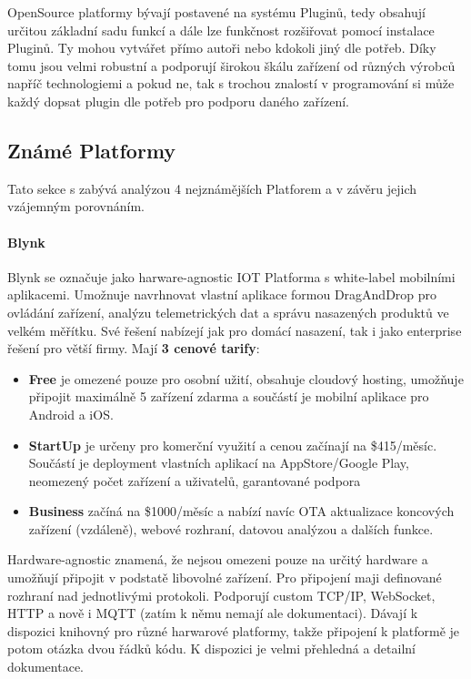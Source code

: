 \documentclass[thesis=B,czech]{FITthesis}[2019/12/23]
\begin{document}
OpenSource platformy bývají postavené na systému Pluginů, tedy obsahují určitou základní sadu funkcí a dále lze funkčnost rozšiřovat pomocí instalace Pluginů. Ty mohou vytvářet přímo autoři nebo kdokoli jiný dle potřeb. Díky tomu jsou velmi robustní a podporují širokou škálu zařízení od různých výrobců napříč technologiemi a pokud ne, tak s trochou znalostí v programování si může každý dopsat plugin dle potřeb pro podporu daného zařízení.


\subsection{Známé Platformy}  %
Tato sekce s zabývá analýzou 4 nejznámějších Platforem a v závěru jejich vzájemným porovnáním.

\paragraph{Blynk}
Blynk se označuje jako harware-agnostic IOT Platforma s white-label mobilními aplikacemi. Umožnuje navrhnovat vlastní aplikace formou DragAndDrop pro ovládání zařízení, analýzu telemetrických dat a správu nasazených produktů ve velkém měřítku. Své řešení nabízejí jak pro domácí nasazení, tak i jako enterprise řešení pro větší firmy. Mají \textbf{3 cenové tarify}:
\begin{itemize}
    \item \textbf{Free} je omezené pouze pro osobní užití, obsahuje cloudový hosting, umožňuje připojit maximálně 5 zařízení zdarma a součástí je mobilní aplikace pro Android a iOS.
    \item \textbf{StartUp} je určeny pro komerční využití a cenou začínají na \$415/měsíc. Součástí je deployment vlastních aplikací na AppStore/Google Play, neomezený počet zařízení a uživatelů, garantované podpora
    \item \textbf{Business} začíná na \$1000/měsíc a nabízí navíc OTA aktualizace koncových zařízení (vzdáleně), webové rozhraní, datovou analýzou a dalších funkce.
\end{itemize}

Hardware-agnostic znamená, že nejsou omezeni pouze na určitý hardware a umožňují připojit v podstatě libovolné zařízení. Pro připojení maji definované rozhraní nad jednotlivými protokoli. Podporují custom TCP/IP, WebSocket, HTTP a nově i MQTT (zatím k němu nemají ale dokumentaci). Dávají k dispozici knihovný pro různé harwarové platformy, takže připojení k platformě je potom otázka dvou řádků kódu. K dispozici je velmi přehledná a detailní dokumentace.
\end{document}
